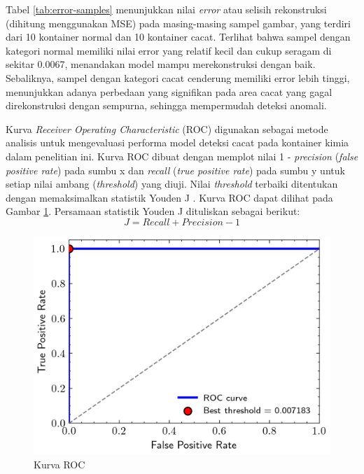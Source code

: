 Tabel \ref{tab:error-samples} menunjukkan nilai \textit{error} atau selisih
rekonstruksi (dihitung menggunakan MSE) pada masing-masing sampel
gambar, yang terdiri dari 10 kontainer normal dan 10 kontainer cacat.
Terlihat bahwa sampel dengan kategori normal memiliki nilai error
yang relatif kecil dan cukup seragam di sekitar 0.0067, menandakan
model mampu merekonstruksi dengan baik. Sebaliknya, sampel dengan
kategori cacat cenderung memiliki error lebih tinggi, menunjukkan
adanya perbedaan yang signifikan pada area cacat yang gagal
direkonstruksi dengan sempurna, sehingga mempermudah deteksi anomali.

Kurva \textit{Receiver Operating Characteristic} (ROC) digunakan
sebagai metode analisis untuk mengevaluasi performa model deteksi
cacat pada kontainer kimia dalam penelitian ini. Kurva ROC dibuat
dengan memplot nilai 1 - \textit{precision} (\textit{false positive
rate}) pada sumbu
x dan \textit{recall} (\textit{true positive rate}) pada sumbu y untuk setiap
nilai ambang (\textit{threshold}) yang diuji. Nilai
\textit{threshold} terbaiki ditentukan dengan memaksimalkan statistik
Youden J \citep{28}. Kurva ROC dapat dilihat pada Gambar
\ref{fig:roc}. Persamaan
statistik Youden J dituliskan sebagai berikut:
\begin{equation}
  J = \textit{Recall} + \textit{Precision} - 1
\end{equation}

\begin{figure}[H]
  \centering
  \includegraphics[]{gambar/roc.png}
  \caption{Kurva ROC}
  \label{fig:roc}
\end{figure}
\vspace{-1em}

